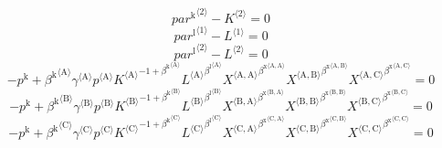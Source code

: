 \begin{equation}
{{p\!a\!r}^{\mathrm{k}}}^{\langle \mathrm{\mathrm{2}}\rangle} - {K}^{\langle \mathrm{2}\rangle} = 0
\end{equation}
\begin{equation}
{{p\!a\!r}^{\mathrm{l}}}^{\langle \mathrm{\mathrm{1}}\rangle} - {L}^{\langle \mathrm{1}\rangle} = 0
\end{equation}
\begin{equation}
{{p\!a\!r}^{\mathrm{l}}}^{\langle \mathrm{\mathrm{2}}\rangle} - {L}^{\langle \mathrm{2}\rangle} = 0
\end{equation}
\begin{equation}
-p^{\mathrm{k}} + {{\beta^{\mathrm{k}}}^{\langle \mathrm{\mathrm{A}}\rangle}} {{\gamma}^{\langle \mathrm{\mathrm{A}}\rangle}} {{p}^{\langle \mathrm{A}\rangle}} {{{K}^{\langle \mathrm{A}\rangle}}^{-1 + {\beta^{\mathrm{k}}}^{\langle \mathrm{\mathrm{A}}\rangle}}} {{{L}^{\langle \mathrm{A}\rangle}}^{{\beta^{\mathrm{l}}}^{\langle \mathrm{\mathrm{A}}\rangle}}} {{{X}^{\langle \mathrm{A},\mathrm{A}\rangle}}^{{\beta^{\mathrm{x}}}^{\langle \mathrm{\mathrm{A}},\mathrm{\mathrm{A}}\rangle}}} {{{X}^{\langle \mathrm{A},\mathrm{B}\rangle}}^{{\beta^{\mathrm{x}}}^{\langle \mathrm{\mathrm{A}},\mathrm{\mathrm{B}}\rangle}}} {{{X}^{\langle \mathrm{A},\mathrm{C}\rangle}}^{{\beta^{\mathrm{x}}}^{\langle \mathrm{\mathrm{A}},\mathrm{\mathrm{C}}\rangle}}} = 0
\end{equation}
\begin{equation}
-p^{\mathrm{k}} + {{\beta^{\mathrm{k}}}^{\langle \mathrm{\mathrm{B}}\rangle}} {{\gamma}^{\langle \mathrm{\mathrm{B}}\rangle}} {{p}^{\langle \mathrm{B}\rangle}} {{{K}^{\langle \mathrm{B}\rangle}}^{-1 + {\beta^{\mathrm{k}}}^{\langle \mathrm{\mathrm{B}}\rangle}}} {{{L}^{\langle \mathrm{B}\rangle}}^{{\beta^{\mathrm{l}}}^{\langle \mathrm{\mathrm{B}}\rangle}}} {{{X}^{\langle \mathrm{B},\mathrm{A}\rangle}}^{{\beta^{\mathrm{x}}}^{\langle \mathrm{\mathrm{B}},\mathrm{\mathrm{A}}\rangle}}} {{{X}^{\langle \mathrm{B},\mathrm{B}\rangle}}^{{\beta^{\mathrm{x}}}^{\langle \mathrm{\mathrm{B}},\mathrm{\mathrm{B}}\rangle}}} {{{X}^{\langle \mathrm{B},\mathrm{C}\rangle}}^{{\beta^{\mathrm{x}}}^{\langle \mathrm{\mathrm{B}},\mathrm{\mathrm{C}}\rangle}}} = 0
\end{equation}
\begin{equation}
-p^{\mathrm{k}} + {{\beta^{\mathrm{k}}}^{\langle \mathrm{\mathrm{C}}\rangle}} {{\gamma}^{\langle \mathrm{\mathrm{C}}\rangle}} {{p}^{\langle \mathrm{C}\rangle}} {{{K}^{\langle \mathrm{C}\rangle}}^{-1 + {\beta^{\mathrm{k}}}^{\langle \mathrm{\mathrm{C}}\rangle}}} {{{L}^{\langle \mathrm{C}\rangle}}^{{\beta^{\mathrm{l}}}^{\langle \mathrm{\mathrm{C}}\rangle}}} {{{X}^{\langle \mathrm{C},\mathrm{A}\rangle}}^{{\beta^{\mathrm{x}}}^{\langle \mathrm{\mathrm{C}},\mathrm{\mathrm{A}}\rangle}}} {{{X}^{\langle \mathrm{C},\mathrm{B}\rangle}}^{{\beta^{\mathrm{x}}}^{\langle \mathrm{\mathrm{C}},\mathrm{\mathrm{B}}\rangle}}} {{{X}^{\langle \mathrm{C},\mathrm{C}\rangle}}^{{\beta^{\mathrm{x}}}^{\langle \mathrm{\mathrm{C}},\mathrm{\mathrm{C}}\rangle}}} = 0
\end{equation}
